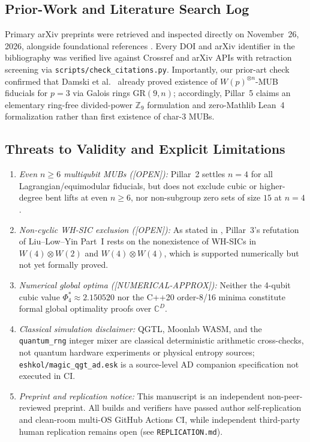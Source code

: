 \documentclass[11pt,reqno]{amsart}
\theoremstyle{definition}
\newcommand{\Z}{\mathbb{Z}}
\newcommand{\C}{\mathbb{C}}
\newcommand{\tagnum}{\textsf{[NUMERICAL-APPROX]}}
\newcommand{\tagopen}{\textsf{[OPEN]}}
\begin{document}
\subsection{Prior-Work and Literature Search Log}
Primary arXiv preprints \cite{Liu2026MaximalMagic,Damski2026ProductWH,Knipfer2026TwoQutrit,Godsil2009Equiangular,Zhu2010SIC,Leone2022SRE}
were retrieved and inspected directly on November~26, 2026, alongside foundational
references \cite{Rothaus1976Bent,Alltop1980Complex,Klappenecker2004MUB,Wootters1989MUB,Bandyopadhyay2002MUB,Gross2006Hudsons,Zauner2011QuantumDesigns,Hoggar1998Lines,Huber2017AME,Provost1980Riemannian}.
Every DOI and arXiv identifier in the bibliography was verified live against Crossref and
arXiv APIs with retraction screening via \texttt{scripts/check\_citations.py}. Importantly,
our prior-art check confirmed that Damski et al.\ \cite{Damski2026ProductWH} already proved
existence of $W(p)^{\otimes n}$-MUB fiducials for $p=3$ via Galois rings $\mathrm{GR}(9,n)$;
accordingly, Pillar~5 claims an elementary ring-free divided-power $\Z_9$ formulation and
zero-Mathlib Lean~4 formalization rather than first existence of char-3 MUBs.

\subsection{Threats to Validity and Explicit Limitations}
\begin{enumerate}[leftmargin=1.8em]
  \item \emph{Even $n\ge 6$ multiqubit MUBs (\tagopen):} Pillar~2 settles $n=4$ for all
  Lagrangian/equimodular fiducials, but does not exclude cubic or higher-degree bent lifts
  at even $n\ge 6$, nor non-subgroup zero sets of size $15$ at $n=4$.
  \item \emph{Non-cyclic WH-SIC exclusion (\tagopen):} As stated in ,
  Pillar~3's refutation of Liu--Low--Yin Part~I rests on the nonexistence of WH-SICs in
  $W(4)\otimes W(2)$ and $W(4)\otimes W(4)$, which is supported numerically but not yet
  formally proved.
  \item \emph{Numerical global optima (\tagnum):} Neither the 4-qubit cubic value
  $\Phi_4^*\approx 2.150520$ nor the C++20 order-8/16 minima constitute formal global
  optimality proofs over $\C^D$.
  \item \emph{Classical simulation disclaimer:} QGTL, Moonlab WASM, and the
  \texttt{quantum\_rng} integer mixer are classical deterministic arithmetic cross-checks,
  not quantum hardware experiments or physical entropy sources; \texttt{eshkol/magic\_qgt\_ad.esk}
  is a source-level AD companion specification not executed in CI.
  \item \emph{Preprint and replication notice:} This manuscript is an independent
  non-peer-reviewed preprint. All builds and verifiers have passed author self-replication
  and clean-room multi-OS GitHub Actions CI, while independent third-party human replication
  remains open (see \texttt{REPLICATION.md}).
\end{enumerate}
\end{document}

